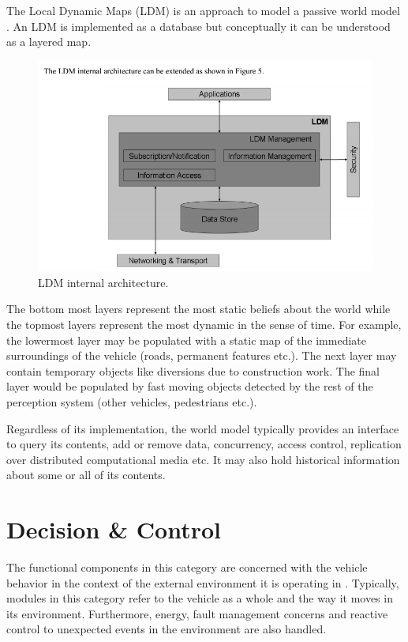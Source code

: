 The Local Dynamic Maps (LDM) is an approach to model a passive world model \cite{Bahere, ETSITR102}. 
An LDM is implemented as a database but conceptually it can be understood as a layered map. 

\begin{figure}[!htb]
\begin{center}
\includegraphics[scale=0.380]{img/ldm_internal_architectuer.png}
\end{center}
\caption{LDM internal architecture.}
\label{ldm_internal_architectuer}
\end{figure}

The bottom most layers represent the most static beliefs about the world while the topmost layers represent the most dynamic in the sense of time. For example, the lowermost layer may be populated with a static map of the immediate surroundings of the vehicle (roads, permanent features etc.). The next layer may contain temporary objects
like diversions due to construction work. The final layer would be populated by fast moving objects detected by the rest of the perception system (other vehicles, pedestrians etc.)\cite{ETSITR102}. 

Regardless of its implementation, the world model typically provides an interface to query its contents, add or remove data, concurrency, access control, replication over distributed computational media etc. It may also hold historical information about some or all of its contents.  


\section{Decision \& Control}
The functional components in this category are concerned with the vehicle behavior 
in the context of the external environment it is operating in \cite{Bahere}. Typically, modules in this category refer to the vehicle as a whole and the way it
moves in its environment. Furthermore, energy, fault management concerns and reactive control to unexpected events in the environment are also handled. 

